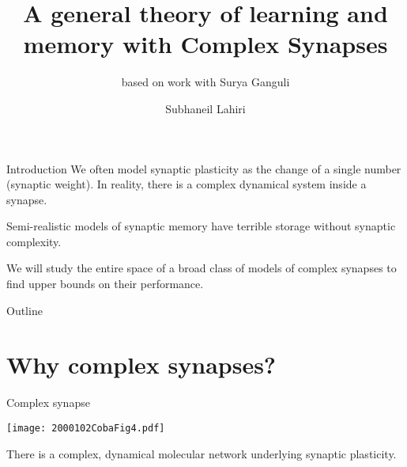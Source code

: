 \documentclass{beamer}%
\title[Complex synapses]{A general theory of learning and memory with Complex Synapses}
\subtitle{\small{based on work with Surya Ganguli}
}
\author{Subhaneil Lahiri%
}
\institute[Stanford]{%
Stanford University, Applied Physics
}
\begin{document}

\begin{frame}
%
 \titlepage
%
\end{frame}


\begin{frame}{Introduction}
%
 We often model synaptic plasticity as the change of a single number (synaptic weight).
 In reality, there is a complex dynamical system inside a synapse.

 \vp Semi-realistic models of synaptic memory have terrible storage without synaptic complexity.

 \vp We will study the entire space of a broad class of models of complex synapses to find upper bounds on their performance.

%
\end{frame}


\begin{frame}{Outline}
%
 \tableofcontents[hideallsubsections]
%
\end{frame}


\section{Why complex synapses?}


\begin{frame}{Complex synapse}
%
 \begin{center}
 \texttt{[image: 2000102CobaFig4.pdf]}
 \end{center}
 There is a complex, dynamical molecular network underlying synaptic plasticity.
%
\end{frame}
\end{document}
